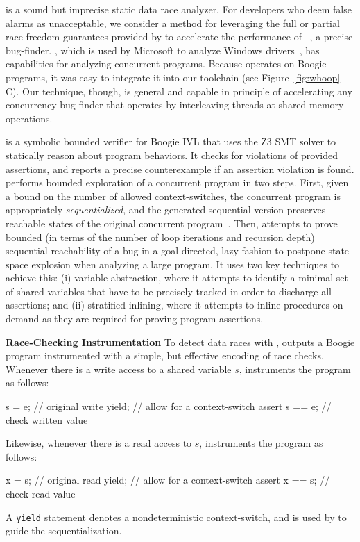 \whoop is a sound but imprecise static data race analyzer. For developers who deem false alarms as unacceptable, we consider a method for leveraging the full or partial race-freedom guarantees provided by \whoop to accelerate the performance of \corral~\cite{lal2012corral}, a precise bug-finder. \corral, which is used by Microsoft to analyze Windows drivers~\cite{lal2014powering}, has capabilities for analyzing concurrent programs.  Because \corral operates on Boogie programs, it was easy to integrate it into our toolchain (see Figure~\ref{fig:whoop} -- C). Our technique, though, is general and capable in principle of accelerating any concurrency bug-finder that operates by interleaving threads at shared memory operations.

\corral is a symbolic bounded verifier for Boogie IVL that uses the Z3 SMT solver to statically reason about program behaviors. It checks for violations of provided assertions, and reports a precise counterexample if an assertion violation is found. \corral performs bounded exploration of a concurrent program in two steps. First, given a bound on the number of allowed context-switches, the concurrent program is appropriately \emph{sequentialized}, and the generated sequential version preserves reachable states of the original concurrent program~\cite{popl2011-eqr,cav2009-lqr,cavLalR08}. Then, \corral attempts to prove bounded (in terms of the number of loop iterations and recursion depth) sequential reachability of a bug in a goal-directed, lazy fashion to postpone state space explosion when analyzing a large program. It uses two key techniques to achieve this: (i) variable abstraction, where it attempts to identify a minimal set of shared variables that have to be precisely tracked in order to discharge all assertions; and (ii) stratified inlining, where it attempts to inline procedures on-demand as they are required for proving program assertions.

\noindent\textbf{Race-Checking Instrumentation }
%
To detect data races with \corral, \whoop outputs a Boogie program instrumented with a simple, but effective encoding of race checks. Whenever there is a write access to a shared variable $s$, \whoop instruments the program as follows:
%
\begin{boogie}
s = e;         // original write
yield;         // allow for a context-switch
assert s == e; // check written value
\end{boogie}\vspace{-2mm}
%
Likewise, whenever there is a read access to $s$, \whoop instruments the program as follows:
%
\begin{boogie}
x = s;         // original read
yield;         // allow for a context-switch
assert x == s; // check read value
\end{boogie}\vspace{-2mm}
%
A \texttt{yield} statement denotes a nondeterministic context-switch, and is used by \corral to guide the sequentialization.

